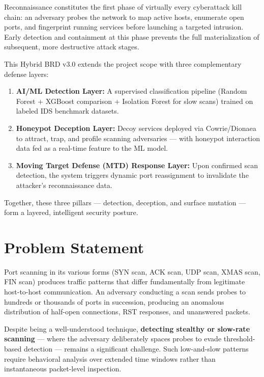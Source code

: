 \documentclass[12pt,a4paper]{article}
\begin{document}
Reconnaissance constitutes the first phase of virtually every cyberattack kill
chain: an adversary probes the network to map active hosts, enumerate open
ports, and fingerprint running services before launching a targeted intrusion.
Early detection and containment at this phase prevents the full materialization
of subsequent, more destructive attack stages.

This Hybrid BRD v3.0 extends the project scope with three complementary
defense layers:

\begin{enumerate}[nosep,leftmargin=1.5em]
  \item \textbf{AI/ML Detection Layer:} A supervised classification pipeline
        (Random Forest + XGBoost comparison + Isolation Forest for slow scans)
        trained on labeled IDS benchmark datasets.
  \item \textbf{Honeypot Deception Layer:} Decoy services deployed via
        Cowrie/Dionaea to attract, trap, and profile scanning adversaries ---
        with honeypot interaction data fed as a real-time feature to the ML model.
  \item \textbf{Moving Target Defense (MTD) Response Layer:} Upon confirmed
        scan detection, the system triggers dynamic port reassignment to
        invalidate the attacker's reconnaissance data.
\end{enumerate}

Together, these three pillars --- detection, deception, and surface mutation ---
form a layered, intelligent security posture.

\section{Problem Statement}

Port scanning in its various forms (SYN scan, ACK scan, UDP scan, XMAS scan,
FIN scan) produces traffic patterns that differ fundamentally from legitimate
host-to-host communication. An adversary conducting a scan sends probes to
hundreds or thousands of ports in succession, producing an anomalous
distribution of half-open connections, RST responses, and unanswered packets.

Despite being a well-understood technique, \textbf{detecting stealthy or
slow-rate scanning} --- where the adversary deliberately spaces probes to
evade threshold-based detection --- remains a significant challenge. Such
low-and-slow patterns require behavioral analysis over extended time windows
rather than instantaneous packet-level inspection.
\end{document}
